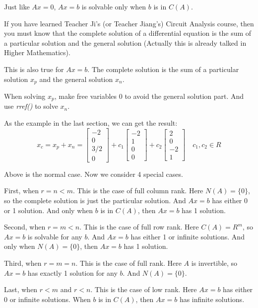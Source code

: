 \documentclass[12pt]{ctexart}
\begin{document}
Just like $Ax = 0$, $Ax = b$ is solvable only when $b$ is in $C(A)$.

If you have learned Teacher Ji's (or Teacher Jiang's) Circuit Analysis course, then
you must know that the complete solution of a differential equation is the sum of a
particular solution and the general solution (Actually this is already talked in
Higher Mathematics).

This is also true for $Ax = b$. The complete solution is the sum of a particular
solution $x_p$ and the general solution $x_n$.

When solving $x_p$, make free variables 0 to avoid the general solution part. And
use \textit{rref()} to solve $x_n$.

As the example in the last section, we can get the result:
\[
  x_c = x_p + x_n =
  \begin{bmatrix}
    -2 \\ 0 \\ 3/2 \\ 0
  \end{bmatrix} +
  c_1 \begin{bmatrix} -2 \\ 1 \\ 0 \\ 0 \end{bmatrix} +
  c_2 \begin{bmatrix} 2 \\ 0 \\ -2 \\ 1 \end{bmatrix}
  \quad c_1, c_2 \in R
\]

Above is the normal case. Now we consider 4 special cases.

First, when $r = n < m$. This is the case of full column rank. Here $N(A) = \{0\}$, so
the complete solution is just the particular solution. And $Ax = b$ has either 0 or 1
solution. And only when $b$ is in $C(A)$, then $Ax = b$ has 1 solution.

Second, when $r = m < n$. This is the case of full row rank. Here $C(A) = R^{m}$, so
$Ax = b$ is solvable for any $b$. And $Ax = b$ has either 1 or infinite solutions.
And only when $N(A) = \{0\}$, then $Ax = b$ has 1 solution.

Third, when $r = m = n$. This is the case of full rank. Here $A$ is invertible, so
$Ax = b$ has exactly 1 solution for any $b$. And $N(A) = \{0\}$.

Last, when $r < m$ and $r < n$. This is the case of low rank. Here $Ax = b$ has either 0 or
infinite solutions. When $b$ is in $C(A)$, then $Ax = b$ has infinite solutions.
\end{document}
